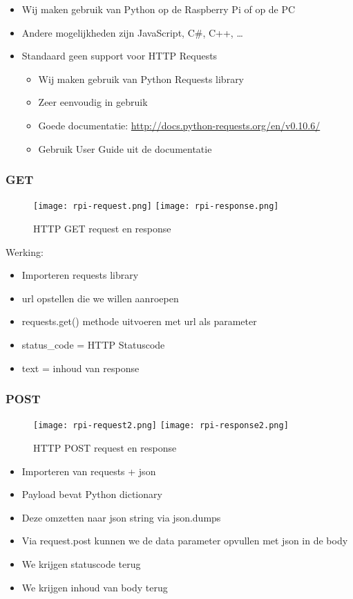 \documentclass{article}
\begin{document}
\begin{itemize}
    \item Wij maken gebruik van Python op de Raspberry Pi of op de PC
    \item Andere mogelijkheden zijn JavaScript, C\#, C++, \dots
    \item Standaard geen support voor HTTP Requests
    \begin{itemize}
        \item Wij maken gebruik van Python Requests library
        \item Zeer eenvoudig in gebruik
        \item Goede documentatie: \url{http://docs.python-requests.org/en/v0.10.6/}
        \item Gebruik User Guide uit de documentatie
    \end{itemize}
\end{itemize}

\subsubsection{GET}

\begin{figure}[H]
    \centering
    \texttt{[image: rpi-request.png]}
    \texttt{[image: rpi-response.png]}
    \caption{HTTP GET request en response}
\end{figure}

Werking: 
\begin{itemize}
    \item Importeren requests library
    \item url opstellen die we willen aanroepen
    \item requests.get() methode uitvoeren met url als parameter
    \item status\_code = HTTP Statuscode
    \item text = inhoud van response
\end{itemize}


\subsubsection{POST}

\begin{figure}[H]
    \centering
    \texttt{[image: rpi-request2.png]}
    \texttt{[image: rpi-response2.png]}
    \caption{HTTP POST request en response}
\end{figure}

\begin{itemize}
    \item Importeren van requests + json
    \item Payload bevat Python dictionary
    \item Deze omzetten naar json string via json.dumps
    \item Via request.post kunnen we de data parameter opvullen met json in de body
    \item We krijgen statuscode terug
    \item We krijgen inhoud van body terug
\end{itemize}
\end{document}
